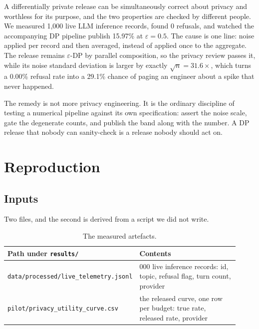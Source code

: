 \documentclass[journal]{IEEEtran}
\theoremstyle{definition}
\newcommand{\Nrec}{1{,}000}
\newcommand{\Nrefused}{0}
\newcommand{\Truerate}{0.00}
\newcommand{\WorstEps}{0.5}
\newcommand{\WorstRelease}{15.97}
\newcommand{\Inflation}{31.6}
\newcommand{\PerAlarmhalf}{29.1}
\newcommand{\TNtel}{1{,}000}
\begin{document}
A differentially private release can be simultaneously correct about privacy and
worthless for its purpose, and the two properties are checked by different
people. We measured \Nrec{} live LLM inference records, found \Nrefused{}
refusals, and watched the accompanying DP pipeline publish \WorstRelease\% at
$\varepsilon=\WorstEps$. The cause is one line: noise applied per record and then
averaged, instead of applied once to the aggregate. The release remains
$\varepsilon$-DP by parallel composition, so the privacy review passes it, while
its noise standard deviation is larger by exactly $\sqrt{n} = \Inflation\times$,
which turns a \Truerate\% refusal rate into a \PerAlarmhalf\% chance of paging an
engineer about a spike that never happened.

The remedy is not more privacy engineering. It is the ordinary discipline of
testing a numerical pipeline against its own specification: assert the noise
scale, gate the degenerate counts, and publish the band along with the number. A
DP release that nobody can sanity-check is a release nobody should act on.

\appendix

\section{Reproduction}
\label{app:repro}

\subsection{Inputs}

Two files, and the second is derived from a script we did not write.

\begin{table}[h]
\centering
\caption{The measured artefacts.}
\label{tab:inputs}
\footnotesize
\setlength{\tabcolsep}{4pt}
\begin{tabular}{@{}>{\raggedright\arraybackslash}p{0.46\linewidth}>{\raggedright\arraybackslash}p{0.46\linewidth}@{}}
\toprule
Path under \texttt{results/} & Contents \\
\midrule
\texttt{data/\allowbreak{}processed/\allowbreak{}live\_\allowbreak{}telemetry.\allowbreak{}jsonl} &
  \TNtel{} live inference records: id, topic, refusal flag, turn count,
  provider \\
\texttt{pilot/\allowbreak{}privacy\_\allowbreak{}utility\_\allowbreak{}curve.\allowbreak{}csv} &
  the released curve, one row per budget: true rate, released rate, provider \\
\bottomrule
\end{tabular}
\end{table}
\end{document}
